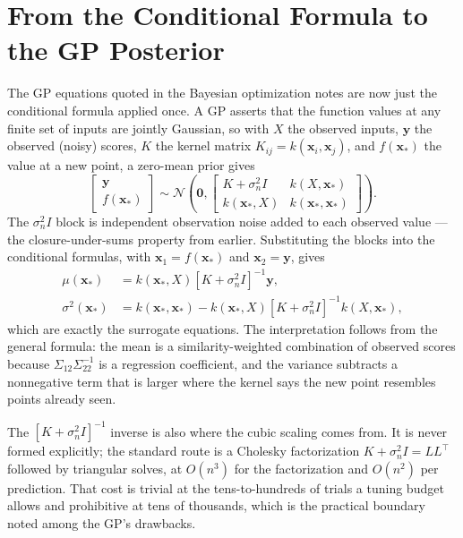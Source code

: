 \documentclass[conference]{IEEEtran}
\begin{document}
\section*{From the Conditional Formula to the GP Posterior}
The GP equations quoted in the Bayesian optimization notes are now just the conditional formula applied once. A GP asserts that the function values at any finite set of inputs are jointly Gaussian, so with $X$ the observed inputs, $\mathbf{y}$ the observed (noisy) scores, $K$ the kernel matrix $K_{ij} = k(\mathbf{x}_i,\mathbf{x}_j)$, and $f(\mathbf{x}_*)$ the value at a new point, a zero-mean prior gives
\begin{equation}
    \begin{bmatrix}\mathbf{y}\\ f(\mathbf{x}_*)\end{bmatrix}
    \sim
    \mathcal{N}\!\left(\mathbf{0},
    \begin{bmatrix}
    K + \sigma_n^2 I & k(X,\mathbf{x}_*)\\
    k(\mathbf{x}_*,X) & k(\mathbf{x}_*,\mathbf{x}_*)
    \end{bmatrix}\right).
\end{equation}
The $\sigma_n^2 I$ block is independent observation noise added to each observed value --- the closure-under-sums property from earlier. Substituting the blocks into the conditional formulas, with $\mathbf{x}_1 = f(\mathbf{x}_*)$ and $\mathbf{x}_2 = \mathbf{y}$, gives
\begin{align}
    \mu(\mathbf{x}_*)      &= k(\mathbf{x}_*, X)\left[K + \sigma_n^2 I\right]^{-1}\mathbf{y}, \\
    \sigma^2(\mathbf{x}_*) &= k(\mathbf{x}_*, \mathbf{x}_*) - k(\mathbf{x}_*, X)\left[K + \sigma_n^2 I\right]^{-1}k(X, \mathbf{x}_*),
\end{align}
which are exactly the surrogate equations. The interpretation follows from the general formula: the mean is a similarity-weighted combination of observed scores because $\Sigma_{12}\Sigma_{22}^{-1}$ is a regression coefficient, and the variance subtracts a nonnegative term that is larger where the kernel says the new point resembles points already seen.

The $[K + \sigma_n^2 I]^{-1}$ inverse is also where the cubic scaling comes from. It is never formed explicitly; the standard route is a Cholesky factorization $K + \sigma_n^2 I = LL^{\!\top}$ followed by triangular solves, at $O(n^3)$ for the factorization and $O(n^2)$ per prediction. That cost is trivial at the tens-to-hundreds of trials a tuning budget allows and prohibitive at tens of thousands, which is the practical boundary noted among the GP's drawbacks.
\end{document}
